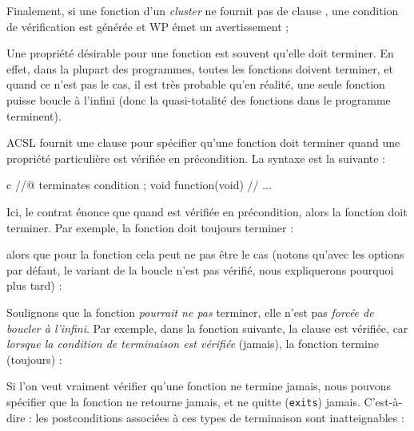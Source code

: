Finalement, si une fonction d'un \emph{cluster} ne fournit pas de clause
, une condition de vérification
 est générée et WP émet un avertissement ;








Une propriété désirable pour une fonction est souvent qu'elle doit terminer.
En effet, dans la plupart des programmes, toutes les fonctions doivent terminer,
et quand ce n'est pas le cas, il est très probable qu'en réalité, une seule
fonction puisse boucle à l'infini (donc la quasi-totalité des fonctions dans le
programme terminent).




ACSL fournit une clause  pour spécifier qu'une fonction
doit terminer quand une propriété particulière est vérifiée en précondition. La
syntaxe est la suivante :


\begin{CodeBlock}{c}
//@ terminates condition ;
void function(void){
  // ...
}
\end{CodeBlock}


Ici, le contrat énonce que quand  est vérifiée en
précondition, alors la fonction doit terminer. Par exemple, la fonction
 doit toujours terminer :




alors que pour la fonction  cela peut ne pas être le cas
(notons qu'avec les options par défaut, le variant de la boucle n'est pas
vérifié, nous expliquerons pourquoi plus tard) :




Soulignons que la fonction \emph{pourrait ne pas} terminer, elle n'est pas
\emph{forcée de boucler à l'infini}. Par exemple, dans la fonction suivante,
la clause  est vérifiée, car
\emph{lorsque la condition de terminaison est vérifiée} (jamais), la fonction
termine (toujours) :




\begin{Information}
  Si l'on veut vraiment vérifier qu'une fonction ne termine jamais, nous pouvons
  spécifier que la fonction ne retourne jamais, et ne quitte (\texttt{exits})
  jamais. C'est-à-dire : les postconditions associées à ces types de terminaison
  sont inatteignables :

\end{Information}


